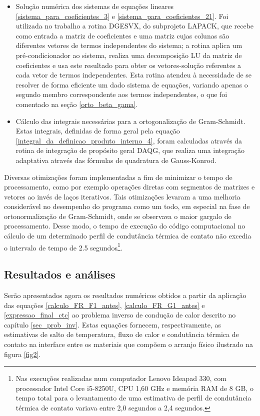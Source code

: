 \begin{itemize}
	\item Solução numérica dos sistemas de equações lineares \eqref{sistema_para_coeficientes_3} e \eqref{sistema_para_coeficientes_21}. Foi utilizada no trabalho a rotina DGESVX, do subprojeto LAPACK, que recebe como entrada a matriz de coeficientes e uma matriz cujas colunas são diferentes vetores de termos independentes do sistema; a rotina aplica um pré-condicionador ao sistema, realiza uma decomposição LU da matriz de coeficientes e usa este resultado para obter os vetores-solução referentes a cada vetor de termos independentes. Esta rotina atendeu à necessidade de se resolver de forma eficiente um dado sistema de equações, variando apenas o segundo membro correspondente aos termos independentes, o que foi comentado na seção \ref{orto_beta_gama}.
	
	\item Cálculo das integrais necessárias para a ortogonalização de Gram-Schmidt. Estas integrais, definidas de forma geral pela equação \eqref{integral_da_definicao_produto_interno_4}, foram calculadas através da rotina de integração de propósito geral DAQG, que realiza uma integração adaptativa através das fórmulas de quadratura de Gauss-Konrod.
\end{itemize}

Diversas otimizações foram implementadas a fim de minimizar o tempo de processamento, como por exemplo operações diretas com segmentos de matrizes e vetores ao invés de laços iterativos. Tais otimizações levaram a uma melhoria considerável no desempenho do programa como um todo, em especial na fase de ortonormalização de Gram-Schmidt, onde se observava o maior gargalo de processamento. Desse modo, o tempo de execução do código computacional no cálculo de um determinado perfil de condutância térmica de contato não excedia o intervalo de tempo de 2.5 segundos\footnote{Nas execuções realizadas num computador Lenovo Ideapad 330, com processador Intel Core\textsuperscript{\texttrademark} i5-8250U, CPU 1,60 GHz e memória RAM de 8 GB, o tempo total para o levantamento de uma estimativa de perfil de condutância térmica de contato variava entre 2,0 segundos a 2,4 segundos.}.

\subsection{Resultados e análises}

Serão apresentados agora os resultados numéricos obtidos a partir da aplicação das equações \eqref{calculo_FR_F1_antes}, \eqref{calculo_FR_G1_antes} e \eqref{expressao_final_ctc} ao problema inverso de condução de calor descrito no capítulo \ref{sec_prob_inv}. Estas equações fornecem, respectivamente, as estimativas de salto de temperatura, fluxo de calor e condutância térmica de contato na interface entre os materiais que compõem o arranjo físico ilustrado na figura \ref{fig2}.

